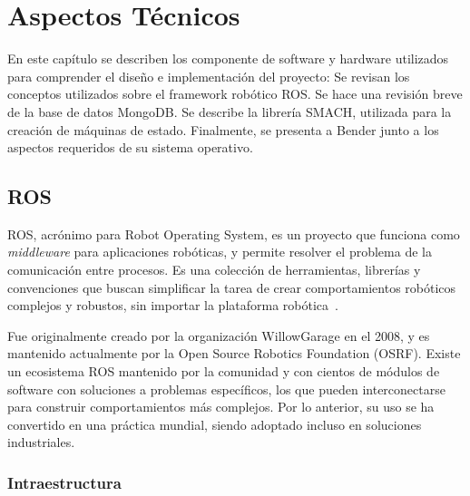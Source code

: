 \chapter{Aspectos Técnicos}\label{chapter:technical}

En este capítulo se describen los componente de software y hardware utilizados para comprender el diseño e implementación del proyecto: Se revisan los conceptos utilizados sobre el framework robótico ROS. Se hace una revisión breve de la base de datos MongoDB. Se describe la librería SMACH, utilizada para la creación de máquinas de estado. Finalmente, se presenta a Bender junto a los aspectos requeridos de su sistema operativo.

\section{ROS}

ROS, acrónimo para Robot Operating System, es un proyecto que funciona como \textit{middleware} para aplicaciones robóticas, y permite resolver el problema de la comunicación entre procesos. Es una colección de herramientas, librerías y convenciones que buscan simplificar la tarea de crear comportamientos robóticos complejos y robustos, sin importar la plataforma robótica~\cite{ROS:2009}.

Fue originalmente creado por la organización WillowGarage en el 2008, y es mantenido actualmente por la Open Source Robotics Foundation (OSRF). Existe un ecosistema ROS mantenido por la comunidad y con cientos de módulos de software con soluciones a problemas específicos, los que pueden interconectarse para construir comportamientos más complejos. Por lo anterior, su uso se ha convertido en una práctica mundial, siendo adoptado incluso en soluciones industriales.


\subsection{Intraestructura}

